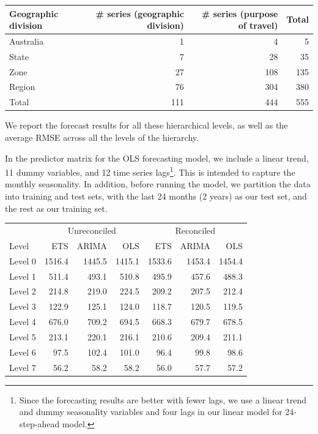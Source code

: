 \documentclass[11pt,a4paper,]{article}
\let\origtable\table
\let\endorigtable\endtable
\renewenvironment{table}[1][2] {
    \expandafter\origtable\expandafter[!htbp]
} {
    \endorigtable
}
\begin{document}
\begin{table}[!h]

\caption{\label{tab:Australiageographicalpurposedivision}Number of Australian domestic tourism series in each level of the hierarchy and group structure.}
\centering
\begin{tabular}{lrrr}
\toprule
Geographic division & \# series (geographic division) & \# series (purpose of travel) & Total\\
\midrule
Australia & 1 & 4 & 5\\
State & 7 & 28 & 35\\
Zone & 27 & 108 & 135\\
Region & 76 & 304 & 380\\
Total & 111 & 444 & 555\\
\bottomrule
\end{tabular}
\end{table}

We report the forecast results for all these hierarchical levels, as well as the average RMSE across all the levels of the hierarchy.

In the predictor matrix for the OLS forecasting model, we include a linear trend, 11 dummy variables, and 12 time series lags\footnote{Since the forecasting results are better with fewer lags, we use a linear trend and dummy seasonality variables and four lags in our linear model for 24-step-ahead model.}. This is intended to capture the monthly seasonality. In addition, before running the model, we partition the data into training and test sets, with the last 24 months (2 years) as our test set, and the rest as our training set.

\begin{table}[!h]

\caption{\label{tab:Tourismdataresulrolling}Mean(RMSE) for ETS, ARIMA and OLS with and without reconciliation - 1-step-ahead - Tourism dataset}
\centering
\begin{tabular}{lrrrrrr}
\toprule
\multicolumn{1}{c}{} & \multicolumn{3}{c}{Unreconciled} & \multicolumn{3}{c}{Reconciled} \\
\cmidrule(l{3pt}r{3pt}){2-4} \cmidrule(l{3pt}r{3pt}){5-7}
Level & ETS & ARIMA & OLS & ETS & ARIMA & OLS\\
\midrule
Level 0 & 1516.4 & 1445.5 & 1415.1 & 1533.6 & 1453.4 & 1454.4\\
Level 1 & 511.4 & 493.1 & 510.8 & 495.9 & 457.6 & 488.3\\
Level 2 & 214.8 & 219.0 & 224.5 & 209.2 & 207.5 & 212.4\\
Level 3 & 122.9 & 125.1 & 124.0 & 118.7 & 120.5 & 119.5\\
Level 4 & 676.0 & 709.2 & 694.5 & 668.3 & 679.7 & 678.5\\
Level 5 & 213.1 & 220.1 & 216.1 & 210.6 & 209.4 & 211.1\\
Level 6 & 97.5 & 102.4 & 101.0 & 96.4 & 99.8 & 98.6\\
Level 7 & 56.2 & 58.2 & 58.2 & 56.0 & 57.7 & 57.2\\
\bottomrule
\end{tabular}
\end{table}
\end{document}
